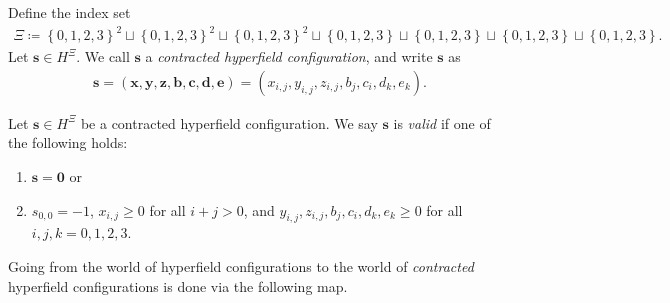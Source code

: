 \begin{definition}
    Define the index set
    \begin{align*}
        \Xi \coloneqq \left\{ 0,1,2,3 \right\}^2 \sqcup \left\{ 0,1,2,3 \right\}^2 \sqcup \left\{ 0,1,2,3 \right\}^2 \sqcup \left\{ 0,1,2,3 \right\} \sqcup \left\{ 0,1,2,3 \right\} \sqcup \left\{ 0,1,2,3 \right\} \sqcup \left\{ 0,1,2,3 \right\}.
    \end{align*}
    Let \( \mathbf{s} \in H^{\Xi} \). We call \( \mathbf{s} \) a \emph{contracted hyperfield configuration}, and write \( \mathbf{s} \) as
    \begin{align*}
        \mathbf{s} = (\mathbf{x}, \mathbf{y}, \mathbf{z}, \mathbf{b}, \mathbf{c}, \mathbf{d}, \mathbf{e}) = (x_{i,j}, y_{i,j}, z_{i,j}, b_j, c_i, d_k, e_k).
    \end{align*}
\end{definition}

\begin{definition}
    Let \( \mathbf{s} \in H^{\Xi}\) be a {contracted hyperfield configuration}.
    We say \( \mathbf{s} \) is \emph{valid} if one of the following holds:
    \begin{enumerate}
        \item \( \mathbf{s} = \mathbf{0} \) or
        \item \( s_{0,0} = -1 \), \( x_{i,j} \geq 0 \) for all \( i+j > 0 \), and \(  y_{i,j}, z_{i,j}, b_j, c_i, d_k, e_k \geq 0 \) for all \( i,j,k = 0,1,2,3 \).
    \end{enumerate}
\end{definition}

Going from the world of hyperfield configurations to the world of \emph{contracted} hyperfield configurations is done via the following map.

